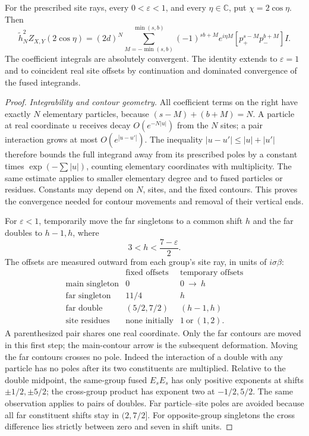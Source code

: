 \begin{theorem}\label{thm:02-contour-sectors}\label{E:contour-sectors}
For the prescribed site rays, every $0<\varepsilon<1$, and every
$\eta\in\mathbb C$, put $\chi=2\cos\eta$. Then
\begin{equation}\label{eq:02-contour-sectors}
 \widetilde h_N^2Z_{X,Y}(2\cos\eta)
 =(2d)^N\sum_{M=-\min(s,b)}^{\min(s,b)}
       (-1)^{sb+M}e^{i\eta M}
       [p_+^{s-M}p_-^{b+M}]I.
\end{equation}
The coefficient integrals are absolutely convergent. The identity
extends to $\varepsilon=1$ and to coincident real site offsets by
continuation and dominated convergence of the fused integrands.
\end{theorem}
\begin{proof}
\emph{Integrability and contour geometry.}
All coefficient terms on the right have exactly $N$ elementary
particles, because $(s-M)+(b+M)=N$. A particle at real coordinate $u$ receives decay
$O(e^{-N|u|})$ from the $N$ sites; a pair interaction grows at most
$O(e^{|u-u'|})$. The inequality
$|u-u'|\le|u|+|u'|$ therefore bounds the full integrand away from
its prescribed poles by a constant times
$\exp(-\sum|u|)$, counting elementary coordinates with multiplicity.
The same estimate applies to smaller elementary degree and to
fused particles or residues. Constants may depend on $N$, sites,
and the fixed contours. This proves the convergence needed for
contour movements and removal of their vertical ends.

For $\varepsilon<1$, temporarily move the far singletons to a common
shift $h$ and the far doubles to $h-1,h$, where
\[
 3<h<\frac{7-\varepsilon}{2}.
\]
The offsets are measured outward from each group's site ray, in units
of $i\sigma\beta$:
\[
\begin{array}{c|c|c}
 &\text{fixed offsets}&\text{temporary offsets}\\\hline
 \text{main singleton}&0&0\ \longrightarrow\ h\\
 \text{far singleton}&11/4&h\\
 \text{far double}&(5/2,7/2)&(h-1,h)\\
 \text{site residues}&\text{none initially}&1\ \text{or}\ (1,2).
\end{array}
\]
A parenthesized pair shares one real coordinate. Only the far contours
are moved in this first step; the main-contour arrow is the subsequent
deformation. Moving the far contours crosses no pole. Indeed the interaction of a double with any
particle has no poles after its two constituents are multiplied.
Relative to the double midpoint, the same-group fused $E_sE_s$
has only positive exponents at shifts $\pm1/2,\pm5/2$; the cross-group
product has exponent two at $-1/2,5/2$. The same observation applies
to pairs of doubles. Far particle--site poles are avoided because
all far constituent shifts stay in $(2,7/2]$. For opposite-group
singletons the cross difference lies strictly between zero and seven
in shift units.


\end{proof}
